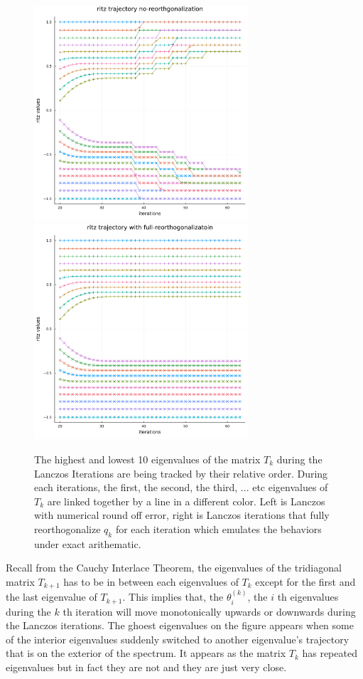 \documentclass[]{article}
\theoremstyle{definition}
\begin{document}
            \begin{figure}[H]\label{fig:2}
                \centering
                \includegraphics[width=8cm]{ritz_trajectory_plot_floats.png}
                \includegraphics[width=8cm]{ritz_trajectory_plot_exact.png}
                \caption{The highest and lowest 10 eigenvalues of the matrix $T_k$ during the Lanczos Iterations are being tracked by their relative order. During each iterations, the first, the second, the third, ... etc eigenvalues of $T_k$ are linked together by a line in a different color. Left is Lanczos with numerical round off error, right is Lanczos iterations that fully reorthogonalize $q_k$ for each iteration which emulates the behaviors under exact arithematic. }
            \end{figure}
            Recall from the Cauchy Interlace Theorem, the eigenvalues of the tridiagonal matrix $T_{k + 1}$ has to be in between each eigenvalues of $T_{k}$ except for the first and the last eigenvalue of $T_{k + 1}$.  This implies that, the $\theta_i^{(k)}$, the $i$ th eigenvalues during the $k$ th iteration will move monotonically upwards or downwards during the Lanczos iterations. The ghoest eigenvalues on the figure appears when some of the interior eigenvalues suddenly switched to another eigenvalue's trajectory that is on the exterior of the spectrum. It appears as the matrix $T_k$ has repeated eigenvalues but in fact they are not and they are just very close. 
\end{document}
